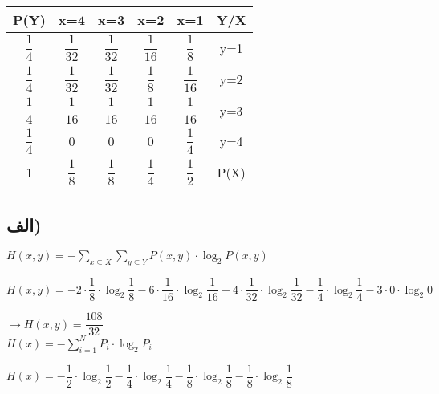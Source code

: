 \def \Subject {}


\section{\Subject}



\begin{table}[h!]
\centering
\begin{tabular}{||c c c c c||c||} 
 \hline
 P(Y) & x=4 & x=3 & x=2 & x=1 & Y/X \\ [0.5ex] 
 \hline\hline
 $\dfrac{1}{4}$ & $\dfrac{1}{32}$ & $\dfrac{1}{32}$ & $\dfrac{1}{16}$ & $\dfrac{1}{8}$ & y=1 \\ 
 $\dfrac{1}{4}$ & $\dfrac{1}{32}$ & $\dfrac{1}{32}$ & $\dfrac{1}{8}$ & $\dfrac{1}{16}$ & y=2 \\
 $\dfrac{1}{4}$ & $\dfrac{1}{16}$ & $\dfrac{1}{16}$ & $\dfrac{1}{16}$ & $\dfrac{1}{16}$ & y=3 \\
 $\dfrac{1}{4}$ & 0 & 0 & 0 & $\dfrac{1}{4}$ & y=4 \\
 1 & $\dfrac{1}{8}$ & $\dfrac{1}{8}$ & $\dfrac{1}{4}$ & $\dfrac{1}{2}$ & P(X) \\ [1ex] 
 \hline
\end{tabular}
\end{table}

\subsection{الف)}

 \null \hfill $ H(x,y) = -\sum_{x \subseteq X}\sum_{y \subseteq Y}  P(x,y) \cdot \log_{2} P(x,y) $
 

\null \hfill $ H(x,y) = - 2 \cdot \dfrac{1}{8} \cdot \log_{2} \dfrac{1}{8} - 6 \cdot \dfrac{1}{16} \cdot \log_{2} \dfrac{1}{16} - 4 \cdot\dfrac{1}{32} \cdot \log_{2} \dfrac{1}{32} - \dfrac{1}{4} \cdot \log_{2} \dfrac{1}{4} - 3 \cdot 0 \cdot \log_{2} 0 $

\null \hfill $  \rightarrow H(x,y) = \dfrac{108}{32} $ \\

\null \hfill $ H(x) = -\sum_{i=1}^{N}  P_i \cdot \log_{2} P_i $

\null \hfill $ H(x) = - \dfrac{1}{2} \cdot \log_{2} \dfrac{1}{2} - \dfrac{1}{4} \cdot \log_{2} \dfrac{1}{4} - \dfrac{1}{8} \cdot \log_{2} \dfrac{1}{8} - \dfrac{1}{8} \cdot \log_{2} \dfrac{1}{8} $

